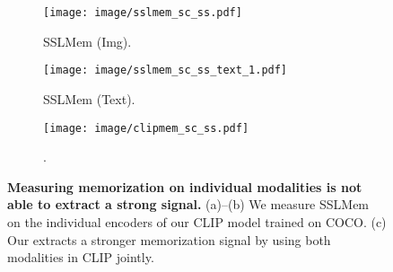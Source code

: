 \begin{figure}[t]
    \centering
    \begin{subfigure}[b]{0.32\textwidth}
        \centering
        \texttt{[image: image/sslmem\_sc\_ss.pdf]}
        \caption{SSLMem (Img).}
    \end{subfigure}
    \begin{subfigure}[b]{0.32\textwidth}
        \centering
        \texttt{[image: image/sslmem\_sc\_ss\_text\_1.pdf]}
        \caption{SSLMem (Text).}
    \end{subfigure}
        \begin{subfigure}[b]{0.32\textwidth}
        \centering
        \texttt{[image: image/clipmem\_sc\_ss.pdf]}
        \caption{\ours.}
    \end{subfigure}
    \caption{\textbf{Measuring memorization on individual modalities is not able to extract a strong signal.} (a)--(b) We measure SSLMem~\citep{wang2024memorization} on the individual encoders of our CLIP model trained on COCO. (c) Our \ours extracts a stronger memorization signal by using both modalities in CLIP jointly. 
    }
    \label{fig:ssl_vs_clip}
\end{figure}
